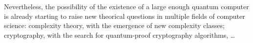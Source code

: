 \documentclass[12pt,a4paper]{article}
\theoremstyle{plain}
\theoremstyle{definition}
\begin{document}
Nevertheless, the possibility of the existence of a large enough quantum computer is already starting to raise new theorical questions in multiple fields of computer science: complexity theory, with the emergence of new complexity classes; cryptography, with the search for quantum-proof cryptography algorithms, \dots 

\nocite{*}
\printbibliography
\end{document}
